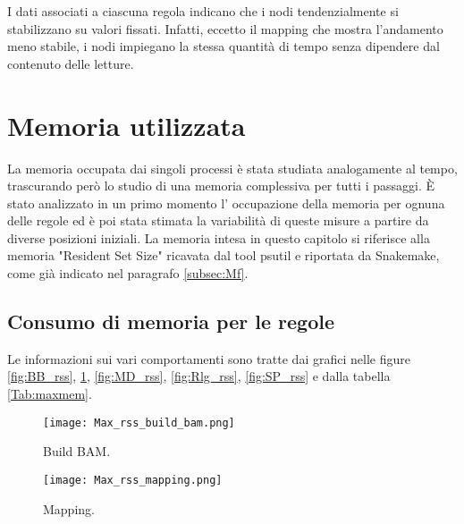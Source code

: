 \begin{table}[H]
\centering
{}
\caption{Media e deviazione standard, espresse in secondi(s), dei tempi di esecuzione delle regole su diversi subset da centomila letture.}
\label{varT}
\end{table}

I dati associati a ciascuna regola indicano che i nodi tendenzialmente si stabilizzano su valori fissati.
Infatti, eccetto il mapping che mostra l'andamento meno stabile, i nodi impiegano la stessa quantità di tempo senza dipendere dal contenuto delle letture. 


\section{Memoria utilizzata}
La memoria occupata dai singoli processi è stata studiata analogamente al tempo, trascurando però lo studio di una memoria complessiva per tutti i passaggi. 
È stato analizzato in un primo momento l' occupazione della memoria per ognuna delle regole ed è poi stata stimata la variabilità di queste misure a partire da diverse posizioni iniziali.
La memoria intesa in questo capitolo si riferisce alla memoria "Resident Set Size" ricavata dal tool psutil e riportata da Snakemake, come già indicato nel paragrafo \ref{subsec:Mf}. 

\subsection{Consumo di memoria per le regole}
Le informazioni sui vari comportamenti sono tratte dai grafici nelle figure \ref{fig:BB_rss}, \ref{fig:Map_rss}, \ref{fig:MD_rss}, \ref{fig:Rlg_rss}, \ref{fig:SP_rss} e dalla tabella \ref{Tab:maxmem}.
\begin{figure}[H]
\begin{minipage}[b]{.5\textwidth}
\centering
\texttt{[image: Max\_rss\_build\_bam.png]}
\caption{Build BAM.}
\label{fig:BB_rss}
\end{minipage}
\hfill
\begin{minipage}[b]{.5\textwidth}
\texttt{[image: Max\_rss\_mapping.png]}
\caption{Mapping.}
\label{fig:Map_rss}	
\end{minipage}
\end{figure}

